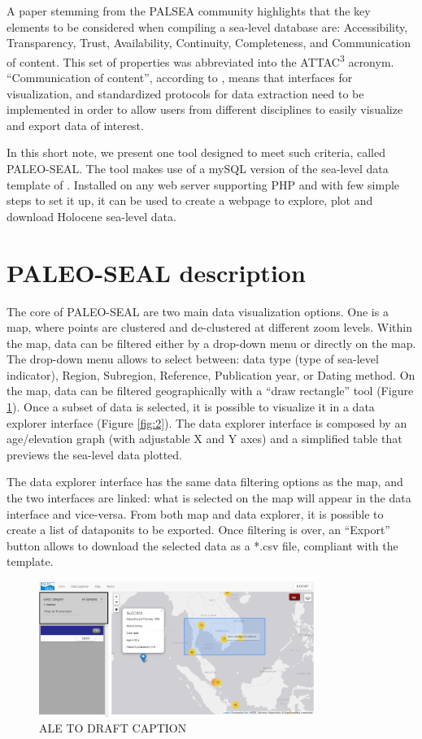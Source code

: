 \documentclass[a4paper,fleqn]{cas-dc}
\begin{document}
A paper stemming from the PALSEA community \citep{dusterhus2016} highlights that the key elements to be considered when compiling a sea-level database are: Accessibility, Transparency, Trust, Availability, Continuity, Completeness, and Communication of
content. This set of properties was abbreviated into the ATTAC\textsuperscript{3} acronym. ``Communication of content'',  according to \citet{dusterhus2016}, means that interfaces for visualization, and standardized protocols for data extraction need to be implemented in order to allow users from different disciplines to easily visualize and export data of interest. 

In this short note, we present one tool designed to meet such criteria, called PALEO-SEAL. The tool makes use of a mySQL version of the sea-level data template of \citet{khan2019}. Installed on any web server supporting PHP and with few simple steps to set it up, it can be used to create a webpage to explore, plot and download Holocene sea-level data. 

\section{PALEO-SEAL description}
The core of PALEO-SEAL are two main data visualization options. One is a map, where points are clustered and de-clustered at different zoom levels. Within the map, data can be filtered either by a drop-down menu or directly on the map. The drop-down menu allows to select between: data type (type of sea-level indicator), Region, Subregion, Reference, Publication year, or Dating method. On the map, data can be filtered geographically with a ``draw rectangle'' tool (Figure \ref{fig:1}). Once a subset of data is selected, it is possible to visualize it in a data explorer interface (Figure \ref{fig:2}). The data explorer interface is composed by an age/elevation graph (with adjustable X and Y axes) and a simplified table that previews the sea-level data plotted. 

The data explorer interface has the same data filtering options as the map, and the two interfaces are linked: what is selected on the map will appear in the data interface and vice-versa. From both map and data explorer, it is possible to create a list of dataponits to be exported. Once filtering is over, an ``Export'' button allows to download the selected data as a *.csv file, compliant with the \citet{khan2019} template.

\begin{figure}
	\centering
	\includegraphics[width=0.8\textwidth]{figs/Figure1.png}
	\caption{ALE TO DRAFT CAPTION}
	\label{fig:1}
\end{figure}
\end{document}
